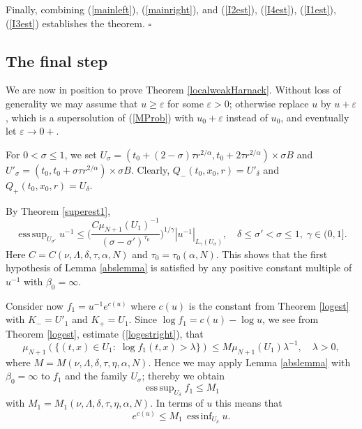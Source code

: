 \documentclass[10pt]{article}
\DeclareMathOperator*{\esup}{ess\,sup}
\DeclareMathOperator*{\einf}{ess\,inf}
\begin{document}
Finally, combining (\ref{mainleft}), (\ref{mainright}), and
(\ref{I2est}), (\ref{I4est}), (\ref{I1est}), (\ref{I3est})
establishes the theorem. $\square$
\subsection{The final step}
We are now in position to prove Theorem \ref{localweakHarnack}.
Without loss of generality we may assume that $u\ge \varepsilon$ for
some $\varepsilon>0$; otherwise replace $u$ by $u+\varepsilon$,
which is a supersolution of (\ref{MProb}) with $u_0+\varepsilon$
instead of $u_0$, and eventually let $\varepsilon\to 0+$.

For $0<\sigma\le 1$, we set $U_\sigma=(t_0+(2-\sigma)\tau
r^{2/\alpha},t_0+2\tau r^{2/\alpha})\times \sigma B$ and
$U'_\sigma=(t_0,t_0+\sigma\tau r^{2/\alpha})\times \sigma B$.
Clearly, $Q_-(t_0,x_0,r)=U'_\delta$ and $Q_+(t_0,x_0,r)=U_\delta$.

By Theorem \ref{superest1},
\[
\esup_{U_{\sigma'}}{u^{-1}} \le \Big(\frac{C \mu_{N+1}(U_1)^{-1}
}{(\sigma-\sigma')^{\tau_0}}\Big)^{1/\gamma}
|u^{-1}|_{L_{\gamma}(U_\sigma)},\quad \delta\le \sigma'<\sigma\le
1,\; \gamma\in (0,1].
\]
Here $C=C(\nu,\Lambda,\delta,\tau,\alpha,N)$ and
$\tau_0=\tau_0(\alpha,N)$. This shows that the first hypothesis of
Lemma \ref{abslemma} is satisfied by any positive constant multiple
of $u^{-1}$ with $\beta_0=\infty$.

Consider now $f_1=u^{-1}e^{c(u)}$ where $c(u)$ is the constant from
Theorem \ref{logest} with $K_-=U'_1$ and $K_+=U_1$. Since $\log
f_1=c(u)-\log u$, we see from Theorem \ref{logest}, estimate
(\ref{logestright}), that
\[ \mu_{N+1}(\{(t,x)\in U_1:\;\log f_1(t,x)>\lambda\})\le
M\mu_{N+1}(U_1)\lambda^{-1},\quad \lambda>0,\] where
$M=M(\nu,\Lambda,\delta,\tau,\eta,\alpha,N)$. Hence we may apply
Lemma \ref{abslemma} with $\beta_0=\infty$ to $f_1$ and the family
$U_\sigma$; thereby we obtain
\[
\esup_{U_\delta} f_1\le M_1\] with
$M_1=M_1(\nu,\Lambda,\delta,\tau,\eta,\alpha,N)$. In terms of $u$
this means that
\begin{equation} \label{HH1}
e^{c(u)}\le M_1\, \einf_{U_\delta} u.
\end{equation}
\end{document}
